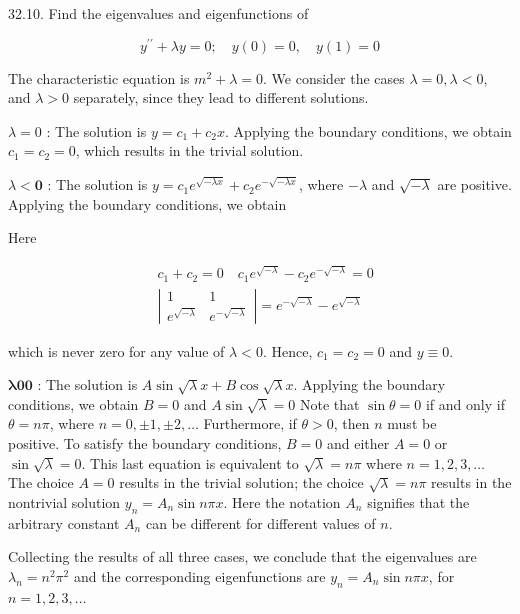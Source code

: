 \documentclass[10pt]{article}
\begin{document}
32.10. Find the eigenvalues and eigenfunctions of

$$
y^{\prime \prime}+\lambda y=0 ; \quad y(0)=0, \quad y(1)=0
$$

The characteristic equation is $m^{2}+\lambda=0$. We consider the cases $\lambda=0, \lambda<0$, and $\lambda>0$ separately, since they lead to different solutions.

$\lambda=0$ : The solution is $y=c_{1}+c_{2} x$. Applying the boundary conditions, we obtain $c_{1}=c_{2}=0$, which results in the trivial solution.

$\lambda<\mathbf{0}$ : The solution is $y=c_{1} e^{\sqrt{-\lambda x}}+c_{2} e^{-\sqrt{-\lambda x}}$, where $-\lambda$ and $\sqrt{-\lambda}$ are positive. Applying the boundary conditions, we obtain

Here

$$
\begin{aligned}
& c_{1}+c_{2}=0 \quad c_{1} e^{\sqrt{-\lambda}}-c_{2} e^{-\sqrt{-\lambda}}=0 \\
& \left|\begin{array}{cc}
1 & 1 \\
e^{\sqrt{-\lambda}} & e^{-\sqrt{-\lambda}}
\end{array}\right|=e^{-\sqrt{-\lambda}}-e^{\sqrt{-\lambda}}
\end{aligned}
$$

which is never zero for any value of $\lambda<0$. Hence, $c_{1}=c_{2}=0$ and $y \equiv 0$.

$\boldsymbol{\lambda} \mathbf{\mathbf { 0 } 0}$ : The solution is $A \sin \sqrt{\lambda} x+B \cos \sqrt{\lambda} x$. Applying the boundary conditions, we obtain $B=0$ and $A \sin \sqrt{\lambda}=0$ Note that $\sin \theta=0$ if and only if $\theta=n \pi$, where $n=0, \pm 1, \pm 2, \ldots$ Furthermore, if $\theta>0$, then $n$ must be\\
positive. To satisfy the boundary conditions, $B=0$ and either $A=0$ or $\sin \sqrt{\lambda}=0$. This last equation is equivalent to $\sqrt{\lambda}=n \pi$ where $n=1,2,3, \ldots$ The choice $A=0$ results in the trivial solution; the choice $\sqrt{\lambda}=n \pi$ results in the nontrivial solution $y_{n}=A_{n} \sin n \pi x$. Here the notation $A_{n}$ signifies that the arbitrary constant $A_{n}$ can be different for different values of $n$.

Collecting the results of all three cases, we conclude that the eigenvalues are $\lambda_{n}=n^{2} \pi^{2}$ and the corresponding eigenfunctions are $y_{n}=A_{n} \sin n \pi x$, for $n=1,2,3, \ldots$
\end{document}
